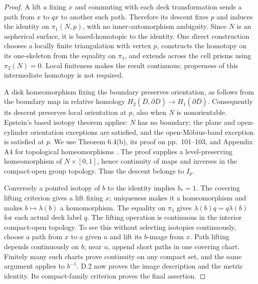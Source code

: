 \begin{proof}
A lift $a$ fixing $x$ and commuting with each deck transformation
sends a path from $x$ to $qx$ to another such path.  Therefore its
descent fixes $p$ and induces the identity on $\pi_1(N,p)$, with no
inner-automorphism ambiguity.  Since $N$ is an aspherical surface,
it is based-homotopic to the identity.  One direct construction
chooses a locally finite triangulation with vertex $p$, constructs
the homotopy on its one-skeleton from the equality on $\pi_1$, and
extends across the cell prisms using $\pi_2(N)=0$.  Local finiteness
makes the result continuous; properness of this intermediate
homotopy is not required.

A disk homeomorphism fixing the boundary preserves orientation,
as follows from the boundary map in relative homology
$H_2(\overline D,\partial\overline D)\to H_1(\partial\overline D)$.
Consequently its descent preserves local orientation at $p$, also
when $N$ is nonorientable.  Epstein's based isotopy theorem applies:
$N$ has no boundary; the plane and open-cylinder orientation
exceptions are satisfied, and the open-M\"obius-band exception is
satisfied at $p$.  We use Theorem 6.4(b), its proof on pp.~101--103,
and Appendix A4 for topological homeomorphisms
\cite{DE_Epstein1966}.  The proof supplies a level-preserving
homeomorphism of $N\times[0,1]$, hence continuity of maps and
inverses in the compact-open group topology.  Thus the descent
belongs to $I_p$.

Conversely a pointed isotopy of $b$ to the identity implies
$b_*=1$.  The covering lifting criterion gives a lift fixing $x$;
uniqueness makes it a homeomorphism and makes $b\mapsto\lambda(b)$
a homomorphism.  The equality on $\pi_1$ gives
$\lambda(b)q=q\lambda(b)$ for each actual deck label $q$.
The lifting operation is continuous in the interior compact-open
topology.  To see this without selecting isotopies continuously,
choose a path from $x$ to a given $u$ and lift its $b$-image from $x$.
Path lifting depends continuously on $b$; near $u$, append short
paths in one covering chart.  Finitely many such charts prove
continuity on any compact set, and the same argument applies to
$b^{-1}$.  D.2 now proves the image description and the metric
identity.  Its compact-family criterion proves the final assertion.
\end{proof}

